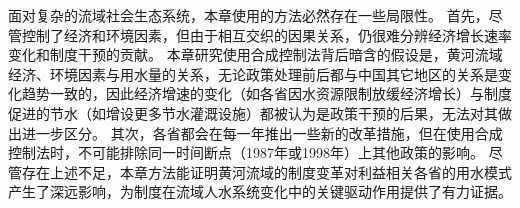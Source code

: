 面对复杂的流域社会\textendash{}生态系统，本章使用的方法必然存在一些局限性。
首先，尽管控制了经济和环境因素，但由于相互交织的因果关系，仍很难分辨经济增长速率变化和制度干预的贡献。
本章研究使用合成控制法背后暗含的假设是，黄河流域经济、环境因素与用水量的关系，无论政策处理前后都与中国其它地区的关系是变化趋势一致的，因此经济增速的变化（如各省因水资源限制放缓经济增长）与制度促进的节水（如增设更多节水灌溉设施）都被认为是政策干预的后果，无法对其做出进一步区分。
其次，各省都会在每一年推出一些新的改革措施，但在使用合成控制法时，不可能排除同一时间断点（1987年或1998年）上其他政策的影响。
尽管存在上述不足，本章方法能证明黄河流域的制度变革对利益相关各省的用水模式产生了深远影响，为制度在流域人\textendash{}水系统变化中的关键驱动作用提供了有力证据。
